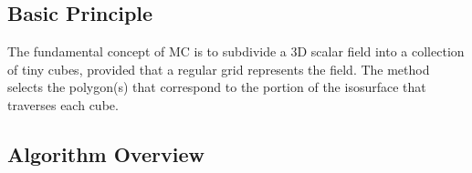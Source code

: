 \vspace{2mm}
\subsection{Basic Principle}

The fundamental concept of MC is to subdivide a 3D scalar field into a collection of tiny cubes, provided that a regular grid represents the field. The method selects the polygon(s) that correspond to the portion of the isosurface that traverses each cube.

\vspace{2mm}
\subsection{Algorithm Overview}

